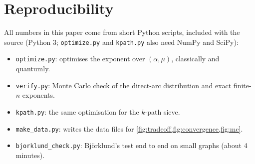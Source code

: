 \documentclass[11pt,a4paper]{article}
\theoremstyle{plain}
\theoremstyle{remark}
\begin{document}
\section{Reproducibility}\label{app:repro}

All numbers in this paper come from short Python scripts, included with the source (Python 3; \texttt{optimize.py} and \texttt{kpath.py} also need NumPy and SciPy):
\begin{itemize}[nosep]
  \item \texttt{optimize.py}: optimises the exponent over $(\alpha,\mu)$, classically and quantumly.
  \item \texttt{verify.py}: Monte Carlo check of the direct-arc distribution and exact finite-$n$ exponents.
  \item \texttt{kpath.py}: the same optimisation for the $k$-path sieve.
  \item \texttt{make\_data.py}: writes the data files for \cref{fig:tradeoff,fig:convergence,fig:mc}.
  \item \texttt{bjorklund\_check.py}: Björklund's test end to end on small graphs (about 4 minutes).
\end{itemize}
\end{document}
